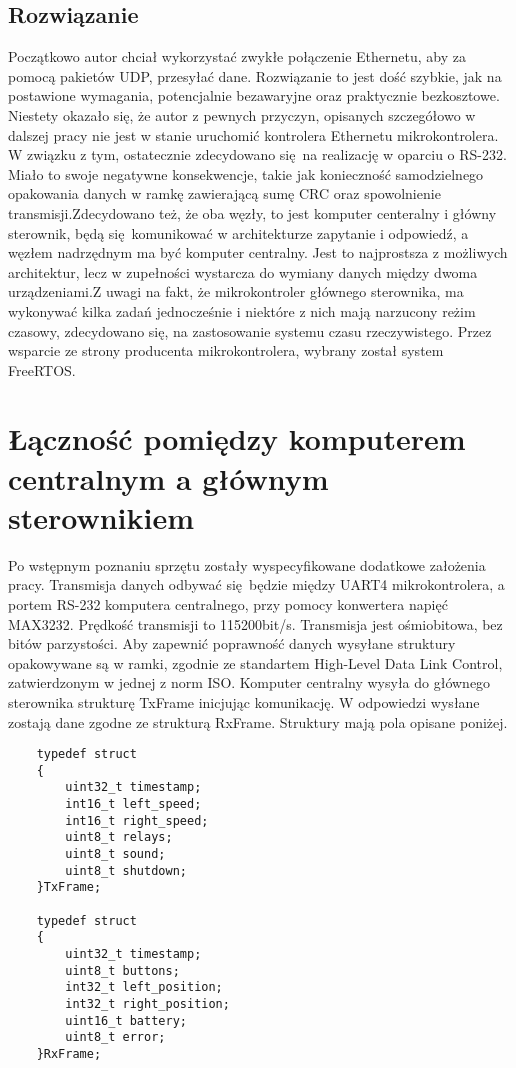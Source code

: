 \documentclass[10pt,a4paper]{article}
\begin{document}
	\subsection{Rozwiązanie}
	Początkowo autor chciał wykorzystać zwykłe połączenie Ethernetu, aby za pomocą pakietów UDP, przesyłać dane. Rozwiązanie to jest dość szybkie, jak na postawione wymagania, potencjalnie bezawaryjne oraz praktycznie bezkosztowe. Niestety okazało się, że autor z pewnych przyczyn, opisanych szczegółowo w dalszej pracy nie jest w stanie uruchomić kontrolera Ethernetu mikrokontrolera. W związku z tym, ostatecznie zdecydowano się na realizację w oparciu o RS-232. Miało to swoje negatywne konsekwencje, takie jak konieczność samodzielnego opakowania danych w ramkę zawierającą sumę CRC oraz spowolnienie transmisji.\newline Zdecydowano też, że oba węzły, to jest komputer centeralny i główny sterownik, będą się komunikować w architekturze zapytanie i odpowiedź, a węzłem nadrzędnym ma być komputer centralny. Jest to najprostsza z możliwych architektur, lecz w zupełności wystarcza do wymiany danych między dwoma urządzeniami.\newline Z uwagi na fakt, że mikrokontroler głównego sterownika, ma wykonywać kilka zadań jednocześnie i niektóre z nich mają narzucony reżim czasowy, zdecydowano się, na zastosowanie systemu czasu rzeczywistego. Przez wsparcie ze strony producenta mikrokontrolera, wybrany został system FreeRTOS.

	\section{Łączność pomiędzy komputerem centralnym a głównym sterownikiem}
	Po wstępnym poznaniu sprzętu zostały wyspecyfikowane dodatkowe założenia pracy. Transmisja danych odbywać się będzie między UART4 mikrokontrolera, a portem RS-232 komputera centralnego, przy pomocy konwertera napięć MAX3232. Prędkość transmisji to 115200bit/s. Transmisja jest ośmiobitowa, bez bitów parzystości. Aby zapewnić poprawność danych wysyłane struktury opakowywane są w ramki, zgodnie ze standartem High-Level Data Link Control, zatwierdzonym w jednej z norm ISO. Komputer centralny wysyła do głównego sterownika strukturę TxFrame inicjując komunikację. W odpowiedzi wysłane zostają dane zgodne ze strukturą RxFrame. Struktury mają pola opisane poniżej.
	\begin{lstlisting}
	typedef struct 
	{
		uint32_t timestamp;
		int16_t left_speed;
		int16_t right_speed;
		uint8_t relays;
		uint8_t sound;
		uint8_t shutdown;
	}TxFrame;

	typedef struct
	{
		uint32_t timestamp;
		uint8_t buttons;
		int32_t left_position;
		int32_t right_position;
		uint16_t battery;
		uint8_t error;
	}RxFrame;
	\end{lstlisting}
\end{document}
